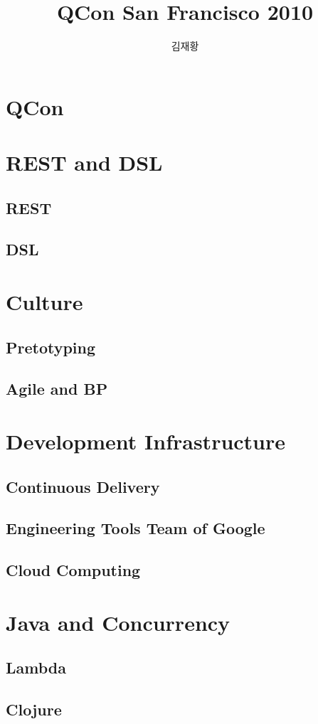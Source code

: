 \documentclass[10pt,unicode,serif,compress,slidetop]{beamer}
\title{QCon San Francisco 2010}
\author{김재황}
\institute{소프트웨어 센터}
\begin{document}
\begin{frame}[plain]
    \titlepage
\end{frame}

\section{QCon}


\section{REST and DSL}
\subsection{REST}

\subsection{DSL}


\section{Culture}
\subsection{Pretotyping}

\subsection{Agile and BP}


\section{Development Infrastructure}
\subsection{Continuous Delivery}

\subsection{Engineering Tools Team of Google}

\subsection{Cloud Computing}


\section{Java and Concurrency}

\subsection{Lambda}


\subsection{Clojure}



% 
\end{document}
